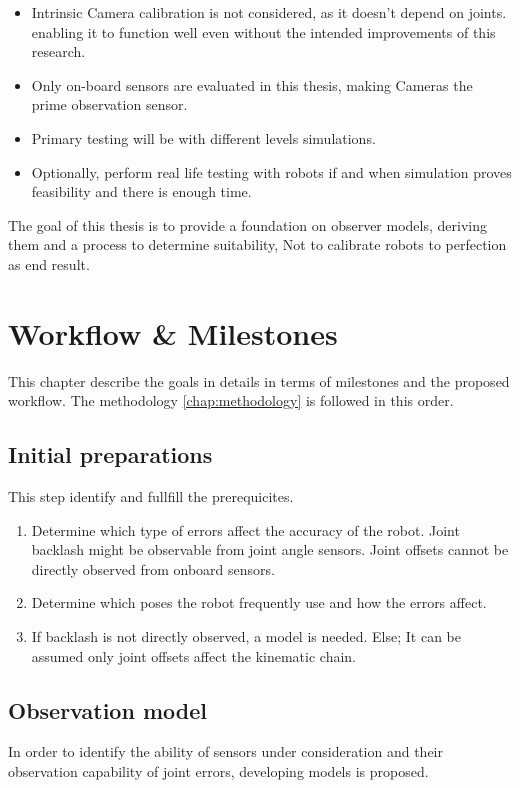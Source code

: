 \documentclass[english, printversion, nomenclature, notitle]{tuvisionthesis} %
\begin{document}
\begin{itemize}
	\item Intrinsic Camera calibration is not considered, as it doesn't depend on joints. enabling it to function well even without the intended improvements of this research.
	\item Only on-board sensors are evaluated in this thesis, making Cameras the prime observation sensor.
	\item Primary testing will be with different levels simulations.
	\item Optionally, perform real life testing with robots if and when simulation proves feasibility and there is enough time.
\end{itemize}

The goal of this thesis is to provide a foundation on observer models, deriving them and a process to determine suitability, Not to calibrate robots to perfection as end result.

\chapter{Workflow \& Milestones}
\label{chap:workflow}

This chapter describe the goals in details in terms of milestones and the proposed workflow.  The methodology \cref{chap:methodology} is followed in this order.

\section{Initial preparations}
This step identify and fullfill the prerequicites.

\begin{enumerate}
	\item Determine which type of errors affect the accuracy of the robot.
	\subitem Joint backlash might be observable from joint angle sensors.
	\subitem Joint offsets cannot be directly observed from onboard sensors.
	\item Determine which poses the robot frequently use and how the errors affect.
	\item If backlash is not directly observed, a model is needed.
	\subitem Else; It can be assumed only joint offsets affect the kinematic chain.
\end{enumerate}

\section{Observation model}
In order to identify the ability of sensors under consideration and their observation capability of joint errors, developing  models is proposed.
\end{document}
